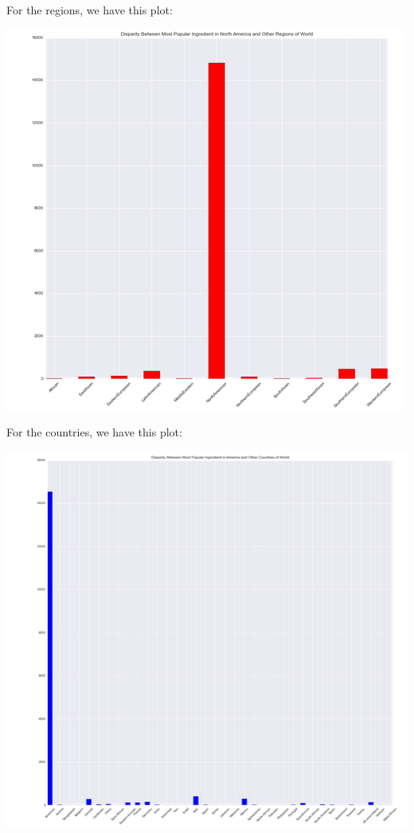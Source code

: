 \documentclass[14pt]{extarticle}
\begin{document}
For the regions, we have this plot:

 \centering
\begin{minipage}[t]{.9\textwidth}
	\includegraphics[width=\textwidth]{Regions_Eggs.png}
\end{minipage}

\raggedright

For the countries, we have this plot:

\centering
\begin{minipage}[t]{.9\textwidth}
	\includegraphics[width=\textwidth]{Countries_Eggs.png}
\end{minipage}
\end{document}
